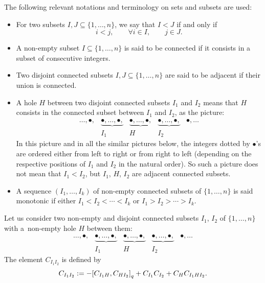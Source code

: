 \documentclass[10pt,a4paper]{amsart}
\numberwithin{equation}{section}
\begin{document}
The following relevant notations and terminology on sets and subsets are used:
\begin{itemize}\itemsep=0pt
 \item For two subsets $I, J \subseteq \{1, \dots, n\}$, we say that $I < J
 $ if and only if
 \begin{equation*}
 i < j , \qquad \forall i \in I, \qquad j \in J.
 \end{equation*}

 \item A non-empty subset $I \subseteq \{1, \dots, n\}$ is said to be connected if it consists in a subset of consecutive integers.

 \item Two disjoint connected subsets $I, J \subseteq \{1, \dots, n\}$ are said to be adjacent if their union is connected.

 \item A hole $H$ between two disjoint connected subsets $I_1$ and $I_2$ means that $H$ consists in the connected subset between $I_1$ and $I_2$, as the picture:
 \begin{equation*}
 \begin{array}{ccccc}
 \dots, \bullet, & \underbrace{ \bullet, \dots, \bullet,} & \underbrace{\bullet, \dots, \bullet,} & \underbrace{\bullet, \dots, \bullet,} & \bullet, \dots\\
 & I_1 & H & I_2 &
 \end{array}
 \end{equation*}
 In this picture and in all the similar pictures below, the integers dotted by $\bullet$'s are ordered either from left to right or from right to left (depending on the respective positions of $I_1$ and $I_2$ in the natural order).
 So such a picture does not mean that $I_1 < I_2$, but $I_1$, $H$, $I_2$ are adjacent connected subsets.
 \item A sequence $(I_1, \dots, I_k)$ of non-empty connected subsets of $\{1, \dots, n\}$ is said monotonic if either $I_1<I_2<\cdots<I_k$ or $I_1> I_2 >\cdots>I_k$.
\end{itemize}

Let us consider two non-empty and disjoint connected subsets $I_1$, $I_2$ of $\{1, \dots, n\}$ with a~non-empty hole $H$ between them:
 \begin{equation*}
 \begin{array}{ccccc}
 \dots, \bullet, & \underbrace{ \bullet, \dots, \bullet,} & \underbrace{\bullet, \dots, \bullet,} & \underbrace{\bullet, \dots, \bullet,} & \bullet, \dots\\
 & I_1 & H & I_2 &
 \end{array}
 \end{equation*}
The element $C_{I_1I_2}$ is defined by
\begin{eqnarray}\label{eqn:C{I_1I_2}}
C_{I_1I_2}:= -{[C_{I_1H}, C_{HI_2}]}_q+C_{I_1}C_{I_2}+C_{H}C_{I_1HI_2}.
\end{eqnarray}
\end{document}
